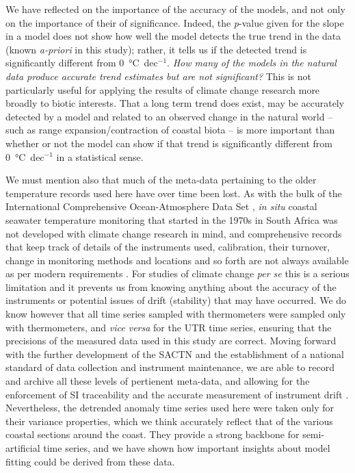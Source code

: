 \documentclass[]{ametsoc}
\begin{document}
We have reflected on the importance of the accuracy of the models, and not only on the importance of their of significance. Indeed, the \emph{p}-value given for the slope in a model does not show how well the model detects the true trend in the data (known \emph{a-priori} in this study); rather, it tells us if the detected trend is significantly different from \SI{0}{\degreeCelsius}~dec$^{-1}$. \emph{How many of the models in the natural data produce accurate trend estimates but are not significant?} This is not particularly useful for applying the results of climate change research more broadly to biotic interests. That a long term trend does exist, may be accurately detected by a model and related to an observed change in the natural world -- such as range expansion/contraction of coastal biota \citep{Bolton2012,Straub2016,Wernberg2016} -- is more important than whether or not the model can show if that trend is significantly different from \SI{0}{\degreeCelsius}~dec$^{-1}$ in a statistical sense.

We must mention also that much of the meta-data pertaining to the older temperature records used here have over time been lost. As with the bulk of the International Comprehensive Ocean-Atmosphere Data Set \citep[ICOADS;][]{Freeman:2016db}, \emph{in situ} coastal seawater temperature monitoring that started in the 1970s in South Africa was not developed with climate change research in mind, and comprehensive records that keep track of details of the instruments used, calibration, their turnover, change in monitoring methods and locations and so forth are not always available as per modern requirements \citep{Aguilar2003}. For studies of climate change \emph{per se} this is a serious limitation and it prevents us from knowing anything about the accuracy of the instruments or potential issues of drift (stability) that may have occurred. We do know however that all time series sampled with thermometers were sampled only with thermometers, and \emph{vice versa} for the UTR time series, ensuring that the precisions of the measured data used in this study are correct. Moving forward with the further development of the SACTN and the establishment of a national standard of data collection and instrument maintenance, we are able to record and archive all these levels of pertienent meta-data, and allowing for the enforcement of SI traceability and the accurate measurement of instrument drift \citep{Jarraud2008}. Nevertheless, the detrended anomaly time series used here were taken only for their variance properties, which we think accurately reflect that of the various coastal sections around the coast. They provide a strong backbone for semi-artificial time series, and we have shown how important insights about model fitting could be derived from these data.
\end{document}
